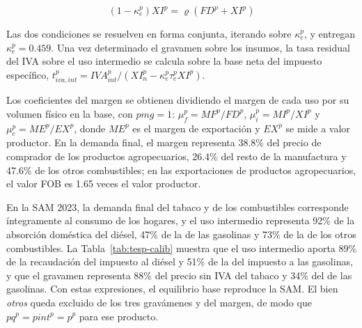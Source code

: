 \documentclass[11pt]{article}
\begin{document}
\[
\left(1-\kappa_{e}^{p}\right)XI^{p}=\varrho\left(FD^{p}+XI^{p}\right)
\]

Las dos condiciones se resuelven en forma conjunta, iterando sobre $\kappa_{e}^{p}$, y entregan $\kappa_{e}^{p}=0.459$. Una vez determinado el gravamen sobre los insumos, la tasa residual del IVA sobre el uso intermedio se calcula sobre la base neta del impuesto específico, $t_{iva,int}^{p}=IVA^{p}_{int}/\left(XI^{p}_{n}-\kappa_{e}^{p}\tau_{e}^{p}XI^{p}\right)$.

Los coeficientes del margen se obtienen dividiendo el margen de cada uso por su volumen físico en la base, con $pmg=1$: $\mu_{f}^{p}=MF^{p}/FD^{p}$, $\mu_{i}^{p}=MI^{p}/XI^{p}$ y $\mu_{e}^{p}=ME^{p}/EX^{p}$, donde $ME^{p}$ es el margen de exportación y $EX^{p}$ se mide a valor productor. En la demanda final, el margen representa 38.8\% del precio de comprador de los productos agropecuarios, 26.4\% del resto de la manufactura y 47.6\% de los otros combustibles; en las exportaciones de productos agropecuarios, el valor FOB es 1.65 veces el valor productor.

En la SAM 2023, la demanda final del tabaco y de los combustibles corresponde íntegramente al consumo de los hogares, y el uso intermedio representa 92\% de la absorción doméstica del diésel, 47\% de la de las gasolinas y 73\% de la de los otros combustibles. La Tabla~\ref{tab:tesp-calib} muestra que el uso intermedio aporta 89\% de la recaudación del impuesto al diésel y 51\% de la del impuesto a las gasolinas, y que el gravamen representa 88\% del precio sin IVA del tabaco y 34\% del de las gasolinas. Con estas expresiones, el equilibrio base reproduce la SAM. El bien \emph{otros} queda excluido de los tres gravámenes y del margen, de modo que $pq^{p}=pint^{p}=p^{p}$ para ese producto.
\end{document}
